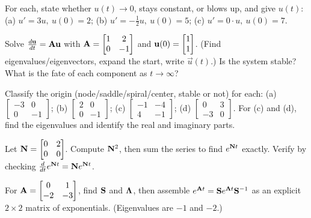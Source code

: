 \begin{exercise}
\label{ch25:ex-scalar}
For each, state whether $u(t)\to0$, stays constant, or blows up, and give $u(t)$:
(a) $u'=3u,\ u(0)=2$; (b) $u'=-\tfrac12 u,\ u(0)=5$; (c) $u'=0\cdot u,\ u(0)=7$.
\end{exercise}

\begin{exercise}
\label{ch25:ex-solve}
Solve $\frac{d\mathbf{u}}{dt}=\mathbf{A}\mathbf{u}$ with
$\mathbf{A}=\begin{bmatrix}1&2\\0&-1\end{bmatrix}$ and $\mathbf{u}(0)=\begin{bmatrix}1\\1\end{bmatrix}$.
(Find eigenvalues/eigenvectors, expand the start, write
$\vec{u}(t)$.) Is the system stable? What is the fate of each component as
$t\to\infty$?
\end{exercise}

\begin{exercise}
\label{ch25:ex-portrait}
Classify the origin (node/saddle/spiral/center, stable or not) for each:
(a) $\begin{bmatrix}-3&0\\0&-1\end{bmatrix}$;
(b) $\begin{bmatrix}2&0\\0&-1\end{bmatrix}$;
(c) $\begin{bmatrix}-1&-4\\4&-1\end{bmatrix}$;
(d) $\begin{bmatrix}0&3\\-3&0\end{bmatrix}$.
For (c) and (d), find the eigenvalues and identify the real and imaginary parts.
\end{exercise}

\begin{exercise}
\label{ch25:ex-series}
Let $\mathbf{N}=\begin{bmatrix}0&2\\0&0\end{bmatrix}$. Compute $\mathbf{N}^2$, then sum
the series to find $e^{\mathbf{N}t}$ exactly. Verify by checking
$\frac{d}{dt}e^{\mathbf{N}t}=\mathbf{N}e^{\mathbf{N}t}$.
\end{exercise}

\begin{exercise}
\label{ch25:ex-diag}
For $\mathbf{A}=\begin{bmatrix}0&1\\-2&-3\end{bmatrix}$, find $\mathbf{S}$ and
$\mathbf{\Lambda}$, then assemble $e^{\mathbf{A}t}=\mathbf{S}e^{\mathbf{\Lambda}t}\mathbf{S}^{-1}$
as an explicit $2\times2$ matrix of exponentials. (Eigenvalues are $-1$ and $-2$.)
\end{exercise}

